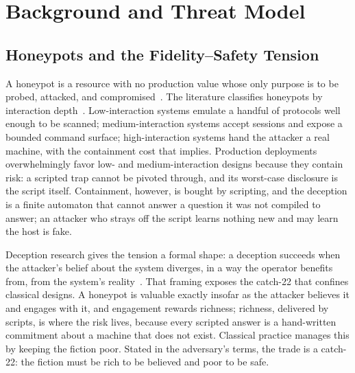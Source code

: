 \section{Background and Threat Model}
\label{sec:background}

\subsection{Honeypots and the Fidelity--Safety Tension}
\label{sec:tension}
A honeypot is a resource with no production value whose only purpose is to
be probed, attacked, and compromised~\cite{spitzner2002}. The literature
classifies honeypots by interaction depth~\cite{lopez2024}. Low-interaction
systems emulate a handful of protocols well enough to be scanned;
medium-interaction systems accept sessions and expose a bounded command
surface; high-interaction systems hand the attacker a real machine, with
the containment cost that implies. Production deployments overwhelmingly
favor low- and medium-interaction designs because they contain risk:
a scripted trap cannot be pivoted through, and its worst-case disclosure
is the script itself. Containment, however, is bought by scripting, and
the deception is a finite automaton that cannot answer a question it was
not compiled to answer; an attacker who strays off the script learns
nothing new and may learn the host is fake.

Deception research gives the tension a formal shape: a deception succeeds
when the attacker's belief about the system diverges, in a way the
operator benefits from, from the system's
reality~\cite{pawlick2021}. That framing exposes the catch-22
that confines classical designs. A honeypot is valuable exactly insofar
as the attacker believes it and engages with it, and engagement rewards
richness; richness, delivered by scripts, is where the risk lives,
because every scripted answer is a hand-written commitment about a
machine that does not exist. Classical practice manages this by keeping
the fiction poor. Stated in the adversary's terms, the trade is a
catch-22: the fiction must be rich to be believed and poor to be safe.

